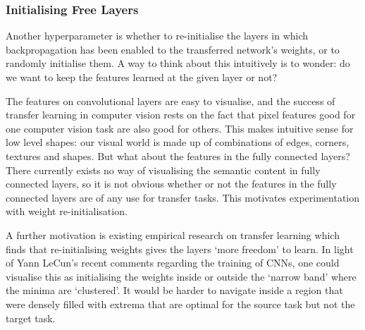 \documentclass[a4paper,11pt]{article}
\begin{document}
\subsubsection{Initialising Free Layers}

Another hyperparameter is whether to re-initialise the layers in which backpropagation has been enabled to the transferred network's weights, or to randomly initialise them. A way to think about this intuitively is to wonder: do we want to keep the features learned at the given layer or not? 

The features on convolutional layers are easy to visualise, and the success of transfer learning in computer vision rests on the fact that pixel features good for one computer vision task are also good for others. This makes intuitive sense for low level shapes: our visual world is made up of combinations of edges, corners, textures and shapes. But what about the features in the fully connected layers? There currently exists no way of visualising the semantic content in fully connected layers, so it is not obvious whether or not the features in the fully connected layers are of any use for transfer tasks. This motivates experimentation with weight re-initialisation. 

A further motivation is existing empirical research \cite{transfer-learning} \cite{decaf} on transfer learning which finds that re-initialising weights gives the layers `more freedom' to learn. In light of Yann LeCun's recent comments regarding the training of CNNs\cite{labex-bezout}, one could visualise this as initialising the weights inside or outside the `narrow band' where the minima are `clustered'. It would be harder to navigate inside a region that were densely filled with extrema that are optimal for the source task but not the target task.  \\
\end{document}
